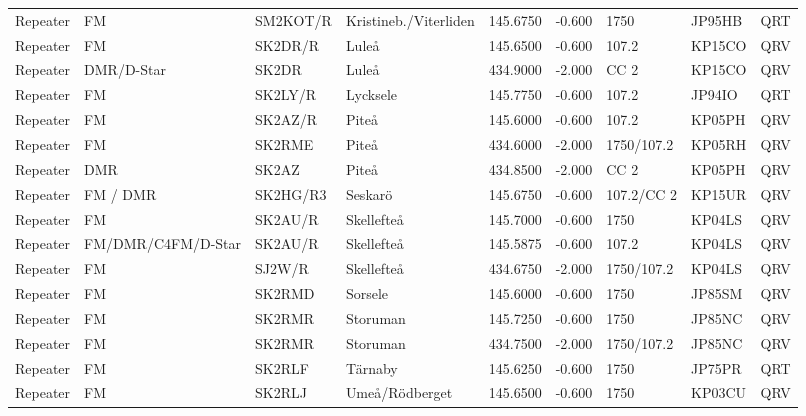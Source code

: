 \begin{landscape}
\begin{longtable}{llllrrlll}
Repeater   & FM          & SM2KOT/R  & Kristineb./Viterliden          & 145.6750     & -0.600     & 1750       & JP95HB      & QRT      \\
Repeater   & FM          & SK2DR/R   & Luleå              & 145.6500     & -0.600     & 107.2      & KP15CO      & QRV      \\
Repeater   & DMR/D-Star  & SK2DR     & Luleå              & 434.9000     & -2.000     & CC 2       & KP15CO      & QRV      \\
Repeater   & FM          & SK2LY/R   & Lycksele           & 145.7750     & -0.600     & 107.2      & JP94IO      & QRT      \\
Repeater   & FM          & SK2AZ/R   & Piteå              & 145.6000     & -0.600     & 107.2      & KP05PH      & QRV      \\
Repeater   & FM          & SK2RME    & Piteå              & 434.6000     & -2.000     & 1750/107.2 & KP05RH      & QRV      \\
Repeater   & DMR         & SK2AZ     & Piteå              & 434.8500     & -2.000     & CC 2       & KP05PH      & QRV      \\
Repeater   & FM / DMR    & SK2HG/R3  & Seskarö            & 145.6750     & -0.600     & 107.2/CC 2 & KP15UR      & QRV      \\
Repeater   & FM          & SK2AU/R   & Skellefteå         & 145.7000     & -0.600     & 1750       & KP04LS      & QRV      \\
Repeater   & FM/DMR/C4FM/D-Star      & SK2AU/R   & Skellefteå         & 145.5875     & -0.600     & 107.2      & KP04LS      & QRV      \\
Repeater   & FM          & SJ2W/R    & Skellefteå         & 434.6750     & -2.000     & 1750/107.2 & KP04LS      & QRV      \\
Repeater   & FM          & SK2RMD    & Sorsele            & 145.6000     & -0.600     & 1750       & JP85SM      & QRV      \\
Repeater   & FM          & SK2RMR    & Storuman           & 145.7250     & -0.600     & 1750       & JP85NC      & QRV      \\
Repeater   & FM          & SK2RMR    & Storuman           & 434.7500     & -2.000     & 1750/107.2 & JP85NC      & QRV      \\
Repeater   & FM          & SK2RLF    & Tärnaby            & 145.6250     & -0.600     & 1750       & JP75PR      & QRT      \\
Repeater   & FM          & SK2RLJ    & Umeå/Rödberget     & 145.6500     & -0.600     & 1750       & KP03CU      & QRV      \\

\end{longtable}
\end{landscape}
